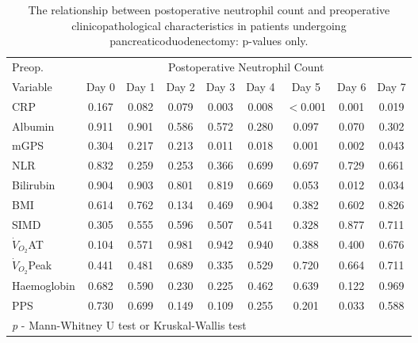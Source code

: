 \begin{sidewaystable}[p]
	\caption{The relationship  between postoperative neutrophil count and preoperative clinicopathological characteristics in patients undergoing pancreaticoduodenectomy: p-values only. }
	\label{table:sirs_neut_pvalues}
	\centering
	\renewcommand{\arraystretch}{1.2} %
	\begin{tabular}{|l | c c c c c c c c|}
			\hline
			Preop.              &       \multicolumn{8}{c|}{Postoperative Neutrophil  Count}       \\
			Variable            & Day 0 & Day 1 & Day 2 & Day 3 & Day 4 & Day 5    & Day 6 & Day 7 \\ \hline
			CRP                 & 0.167 & 0.082 & 0.079 & 0.003 & 0.008 & $<$0.001 & 0.001 & 0.019 \\
			Albumin             & 0.911 & 0.901 & 0.586 & 0.572 & 0.280 & 0.097    & 0.070 & 0.302 \\
			mGPS                & 0.304 & 0.217 & 0.213 & 0.011 & 0.018 & 0.001    & 0.002 & 0.043 \\
			NLR                 & 0.832 & 0.259 & 0.253 & 0.366 & 0.699 & 0.697    & 0.729 & 0.661 \\
			Bilirubin           & 0.904 & 0.903 & 0.801 & 0.819 & 0.669 & 0.053    & 0.012 & 0.034 \\
			BMI                 & 0.614 & 0.762 & 0.134 & 0.469 & 0.904 & 0.382    & 0.602 & 0.826 \\
			SIMD                & 0.305 & 0.555 & 0.596 & 0.507 & 0.541 & 0.328    & 0.877 & 0.711 \\
			$\dot{V}_{O_2}$AT   & 0.104 & 0.571 & 0.981 & 0.942 & 0.940 & 0.388    & 0.400 & 0.676 \\
			$\dot{V}_{O_2}$Peak & 0.441 & 0.481 & 0.689 & 0.335 & 0.529 & 0.720    & 0.664 & 0.711 \\
			Haemoglobin         & 0.682 & 0.590 & 0.230 & 0.225 & 0.462 & 0.639    & 0.122 & 0.969 \\
			PPS                 & 0.730 & 0.699 & 0.149 & 0.109 & 0.255 & 0.201    & 0.033 & 0.588 \\ \hline
			\multicolumn{9}{l}{\textit{p} - Mann-Whitney U test or Kruskal-Wallis test}
		\end{tabular}
\end{sidewaystable}